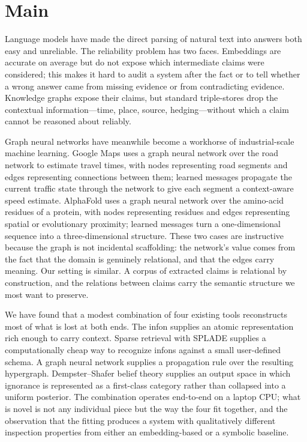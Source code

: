 \documentclass[11pt,a4paper]{article}
\begin{document}
\section{Main}

Language models have made the direct parsing of natural text into
answers both easy and unreliable. The reliability problem has two
faces. Embeddings are accurate on average but do not expose which
intermediate claims were considered; this makes it hard to audit a
system after the fact or to tell whether a wrong answer came from
missing evidence or from contradicting evidence. Knowledge graphs
expose their claims, but standard triple-stores drop the contextual
information---time, place, source, hedging---without which a claim
cannot be reasoned about reliably.

Graph neural networks have meanwhile become a workhorse of
industrial-scale machine learning. Google Maps uses a graph neural
network over the road network to estimate travel times, with
nodes representing road segments and edges representing
connections between them; learned messages propagate the current
traffic state through the network to give each segment a
context-aware speed estimate. AlphaFold uses a graph neural
network over the amino-acid residues of a protein, with nodes
representing residues and edges representing spatial or
evolutionary proximity; learned messages turn a one-dimensional
sequence into a three-dimensional structure. These two cases are
instructive because the graph is not incidental scaffolding: the
network's value comes from the fact that the domain is genuinely
relational, and that the edges carry meaning. Our setting is
similar. A corpus of extracted claims is relational by
construction, and the relations between claims carry the semantic
structure we most want to preserve.

We have found that a modest combination of four existing tools
reconstructs most of what is lost at both ends. The infon supplies
an atomic representation rich enough to carry context. Sparse
retrieval with SPLADE supplies a computationally cheap way to
recognize infons against a small user-defined schema. A graph
neural network supplies a propagation rule over the resulting
hypergraph. Dempster--Shafer belief theory supplies an output
space in which ignorance is represented as a first-class category
rather than collapsed into a uniform posterior. The combination
operates end-to-end on a laptop CPU; what is novel is not any
individual piece but the way the four fit together, and the
observation that the fitting produces a system with qualitatively
different inspection properties from either an embedding-based or
a symbolic baseline.
\end{document}
